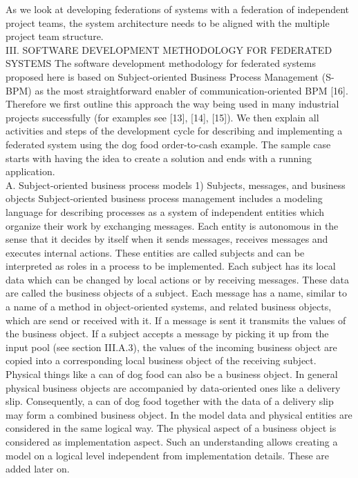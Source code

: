 As we look at developing federations of systems with a federation of independent project teams, the system architecture needs to be aligned with the multiple project team structure.
\\

III.	SOFTWARE DEVELOPMENT METHODOLOGY FOR FEDERATED SYSTEMS
The software development methodology for federated systems proposed here is based on Subject-oriented Business Process Management (S-BPM) as the most straightforward enabler of communication-oriented BPM [16]. Therefore we first outline this approach the way being used in many industrial projects successfully (for examples see [13], [14], [15]). We then explain all activities and steps of the development cycle for describing and implementing a federated system using the dog food order-to-cash example. The sample case starts with having the idea to create a solution and ends with a running application.
\\
A.	Subject-oriented business process models
1)	Subjects, messages, and business objects
Subject-oriented business process management includes a modeling language for describing processes as a system of independent entities which organize their work by exchanging messages. Each entity is autonomous in the sense that it decides by itself when it sends messages, receives messages and executes internal actions. These entities are called subjects and can be interpreted as roles in a process to be implemented. Each subject has its local data which can be changed by local actions or by receiving messages. These data are called the business objects of a subject. Each message has a name, similar to a name of a method in object-oriented systems, and related business objects, which are send or received with it. If a message is sent it transmits the values of the business object. If a subject accepts a message by picking it up from the input pool (see section III.A.3), the values of the incoming business object are copied into a corresponding local business object of the receiving subject.
Physical things like a can of dog food can also be a business object. In general physical business objects are accompanied by data-oriented ones like a delivery slip. Consequently, a can of dog food together with the data of a delivery slip may form a combined business object. In the model data and physical entities are considered in the same logical way. The physical aspect of a business object is considered as implementation aspect. Such an understanding allows creating a model on a logical level independent from implementation details. These are added later on.
